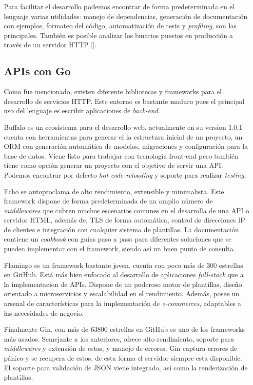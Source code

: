 Para facilitar el desarrollo podemos encontrar de forma predeterminada en el lenguaje varias utilidades: manejo de dependencias, generación de documentación con ejemplos, formateo del código, automatización de tests y \textit{profiling}, son las principales. También es posible analizar los binarios puestos en producción a través de un servidor HTTP [\cite{go-pros-cons}].

\subsection{APIs con Go}

Como fue mencionado, existen diferente bibliotecas y frameworks para el desarrollo de servicios HTTP. Este entorno es bastante maduro pues el principal uso del lenguaje es escribir aplicaciones de \textit{back-end}.

Buffalo es un ecosistema para el desarrollo web, actualmente en su version 1.0.1 cuenta con herramientas para generar el la estructura inicial de un proyecto, un ORM con generación automática de modelos, migraciones y configuración para la base de datos. Viene listo para trabajar con tecnología front-end pero también tiene como opción generar un proyecto con el objetivo de servir una API. Podemos encontrar por defecto \textit{hot code reloading} y soporte para realizar \textit{testing}.
              
Echo se autoproclama de alto rendimiento, extensible y minimalista. Este framework dispone de forma predeterminada de un amplio número de \textit{middlewares} que cubren muchos escenarios comunes en el desarrolla de una API o servidor HTML, además de, TLS de forma automática, control de direcciones IP de clientes e integración con cualquier sistema de plantillas. La documentación contiene un \textit{cookbook} con guías paso a paso para diferentes soluciones que se pueden implementar  con el framework, siendo así un buen punto de consulta.

Flamingo es un framework bastante joven, cuenta con poco más de 300 estrellas en GitHub. Está más bien enfocado al desarrollo de aplicaciones \textit{full-stack} que a la implementacion de APIs. Dispone de un poderoso motor de plantillas, diseño orientado a microservicios y escalabilidad en el rendimiento. Además, posee un arsenal de características para la implementación de \textit{e-commerces}, adaptables a las necesidades de negocio.

Finalmente Gin, con más de 63800 estrellas en GitHub es uno de los frameworks más usados. Semejante a los anteriores, ofrece alto rendimiento, soporte para \textit{middlewares} y extensión de estas, y manejo de errores. Gin captura errores  de pánico y se recupera de estos, de esta forma el servidor siempre esta disponible. El soporte para validación de JSON viene integrado, así como la renderización de plantillas.

